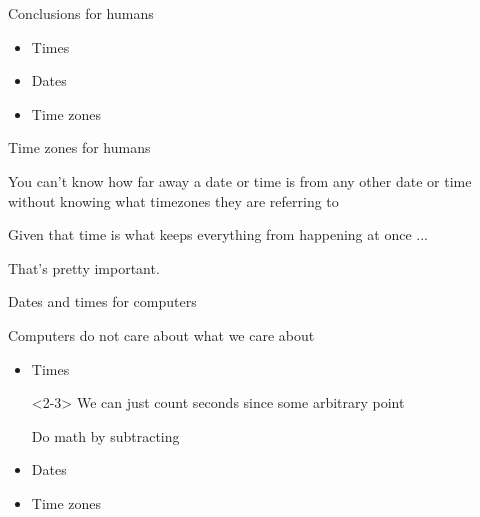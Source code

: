 \documentclass[xcolor=svgnames,17pt]{beamer}
\begin{document}
\begin{frame}{Conclusions for humans}

\begin{itemize}
\item Times


\item Dates


\item Time zones


\end{itemize}


\end{frame}

\begin{frame}{Time zones for humans}

You can’t know how far away a date or time is from any other date or time
without knowing what timezones they are referring to \\[\baselineskip]

\pause

Given that time is what keeps everything from happening at once ...
\\[\baselineskip]

\pause

That’s pretty important.

\end{frame}


\begin{frame}{Dates and times for computers}

Computers do not care about what we care about

\pause

\begin{itemize}
\item \alert<1-2>{Times}

\begin{onlyenv}<2-3>
We can just count seconds since some arbitrary point

Do math by subtracting
\end{onlyenv}


\item \alert<4>{Dates}
\item \alert<4>{Time zones}


\end{itemize}

\end{frame}
\end{document}
